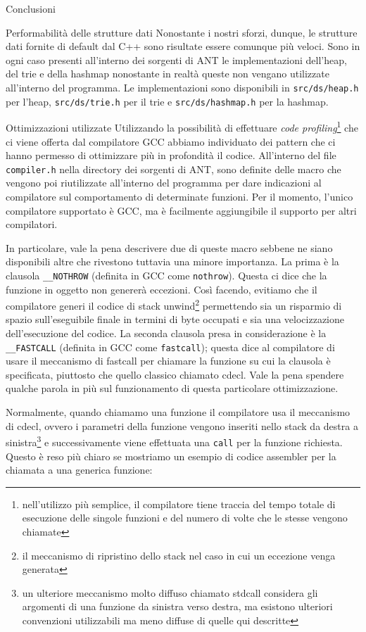 \begin{chapter}{Conclusioni}
\begin{section}{Performabilit\`a delle strutture dati}
Nonostante i nostri sforzi, dunque, le strutture dati fornite di default dal C++
sono risultate essere comunque pi\`u veloci. Sono in ogni caso presenti all'interno
dei sorgenti di ANT le implementazioni dell'heap, del trie e della hashmap nonostante
in realt\`a queste non vengano utilizzate all'interno del programma. Le
implementazioni sono disponibili in \verb,src/ds/heap.h, per l'heap, \verb,src/ds/trie.h,
per il trie e \verb,src/ds/hashmap.h, per la hashmap.
\end{section}

\begin{section}{Ottimizzazioni utilizzate}
Utilizzando la possibilit\`a di effettuare \textit{code profiling}\footnote{
nell'utilizzo pi\`u semplice, il compilatore tiene traccia del tempo totale
di esecuzione delle singole funzioni e del numero di volte che le stesse vengono chiamate}
che ci viene offerta dal compilatore GCC abbiamo individuato dei pattern che ci hanno
permesso di ottimizzare pi\`u in profondit\`a il codice. All'interno del file \verb,compiler.h,
nella directory dei sorgenti di ANT, sono definite delle macro che vengono poi riutilizzate
all'interno del programma per dare indicazioni al compilatore sul comportamento di
determinate funzioni. Per il momento, l'unico compilatore supportato \`e GCC, ma \`e
facilmente aggiungibile il supporto per altri compilatori.

In particolare, vale la pena descrivere due di queste macro sebbene ne siano disponibili
altre che rivestono tuttavia una minore importanza. La prima \`e la clausola
\verb,__NOTHROW, (definita in GCC come \verb,nothrow,). Questa ci dice che la funzione
in oggetto non generer\`a eccezioni. Cos\`i facendo, evitiamo che il compilatore generi
il codice di stack unwind\footnote{il meccanismo di ripristino dello stack nel caso in
cui un eccezione venga generata} permettendo sia un  risparmio di spazio sull'eseguibile
finale in termini di byte occupati e sia una velocizzazione dell'esecuzione del codice.
La seconda clausola presa in considerazione \`e la \verb,__FASTCALL, (definita in GCC
come \verb,fastcall,); questa dice al compilatore di usare il meccanismo di fastcall per
chiamare la funzione su cui la clausola \`e specificata, piuttosto che quello classico
chiamato cdecl. Vale la pena spendere qualche parola in pi\`u sul funzionamento di
questa particolare ottimizzazione.

Normalmente, quando chiamamo una funzione il compilatore usa il meccanismo di cdecl,
ovvero i parametri della funzione vengono inseriti nello stack da destra a sinistra\footnote{
un ulteriore meccanismo molto diffuso chiamato stdcall considera gli argomenti di una
funzione da sinistra verso destra, ma esistono ulteriori convenzioni utilizzabili ma meno
diffuse di quelle qui descritte} e successivamente viene effettuata una \verb,call,
per la funzione richiesta. Questo \`e reso pi\`u chiaro se mostriamo un esempio di codice
assembler per la chiamata a una generica funzione:


\end{section}
\end{chapter}
